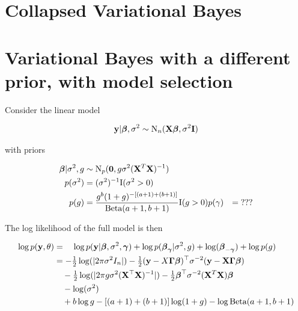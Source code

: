 \documentclass{amsart}[12pt]
\begin{document}
\section{Collapsed Variational Bayes}


\section{Variational Bayes with a different prior, with model selection}

Consider the linear model

\begin{align*}
{\bf y} | {\boldsymbol \beta}, \sigma^2 \sim \text{N}_n({\bf X} {\boldsymbol \beta}, \sigma^2 {\bf I})
\end{align*}

with priors

\begin{align*}
{\boldsymbol\beta} | \sigma^2, g &\sim \text{N}_p({\bf 0}, g \sigma^2 ({\bf X}^T {\bf X})^{-1}) \\
p(\sigma^2) &= (\sigma^2)^{-1} \text{I}(\sigma^2 > 0) \\
p(g) &= \frac{g^b (1 + g)^{-[(a + 1) + (b + 1)]}}{\text{Beta} (a + 1, b + 1)} \text{I}(g > 0)
p(\gamma) &= \text{???}
\end{align*}

The log likelihood of the full model is then

\begin{align*}
\log p({\bf y}, \theta) &= \quad\log p({\bf y}|{\boldsymbol \beta}, \sigma^2, {\boldsymbol \gamma}) + \log p({\boldsymbol \beta}_{\boldsymbol \gamma} | \sigma^2, g) + \log({\boldsymbol \beta}_{-{\boldsymbol \gamma}}) + \log p(g) \\
&= -\tfrac{1}{2} \log(|2 \pi \sigma^2 I_n|) - \tfrac{1}{2} ({\bf y} - X {\boldsymbol \Gamma} {\boldsymbol \beta})^\top \sigma^{-2} ({\bf y} - {\bf X} {\boldsymbol \Gamma} {\boldsymbol \beta}) \\
&\quad -\tfrac{1}{2} \log(|2 \pi g \sigma^2 ({\bf X}^\top {\bf X})^{-1}|) -\tfrac{1}{2} {\boldsymbol \beta}^\top \sigma^{-2} ({\bf X}^T {\bf X}) {\boldsymbol \beta} \\
&\quad - \log (\sigma^2) \\
&\quad + b \log g - [(a + 1) + (b + 1)] \log (1 + g) - \log \text{Beta} (a + 1, b + 1)
\end{align*}
\end{document}

